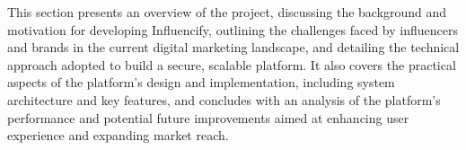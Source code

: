 \begin{justify}
This section presents an overview of the project, discussing the background and motivation for developing Influencify, outlining the challenges faced by influencers and brands in the current digital marketing landscape, and detailing the technical approach adopted to build a secure, scalable platform. It also covers the practical aspects of the platform’s design and implementation, including system architecture and key features, and concludes with an analysis of the platform’s performance and potential future improvements aimed at enhancing user experience and expanding market reach.




\end{justify}

